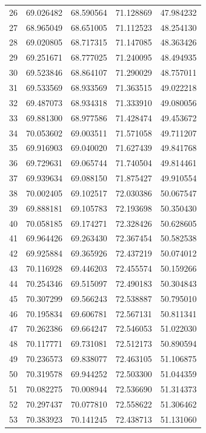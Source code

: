 \begin{table}
\begin{tabular}{rrrrr}
26 & 69.026482 & 68.590564 & 71.128869 & 47.984232 \\
27 & 68.965049 & 68.651005 & 71.112523 & 48.254130 \\
28 & 69.020805 & 68.717315 & 71.147085 & 48.363426 \\
29 & 69.251671 & 68.777025 & 71.240095 & 48.494935 \\
30 & 69.523846 & 68.864107 & 71.290029 & 48.757011 \\
31 & 69.533569 & 68.933569 & 71.363515 & 49.022218 \\
32 & 69.487073 & 68.934318 & 71.333910 & 49.080056 \\
33 & 69.881300 & 68.977586 & 71.428474 & 49.453672 \\
34 & 70.053602 & 69.003511 & 71.571058 & 49.711207 \\
35 & 69.916903 & 69.040020 & 71.627439 & 49.841768 \\
36 & 69.729631 & 69.065744 & 71.740504 & 49.814461 \\
37 & 69.939634 & 69.088150 & 71.875427 & 49.910554 \\
38 & 70.002405 & 69.102517 & 72.030386 & 50.067547 \\
39 & 69.888181 & 69.105783 & 72.193698 & 50.350430 \\
40 & 70.058185 & 69.174271 & 72.328426 & 50.628605 \\
41 & 69.964426 & 69.263430 & 72.367454 & 50.582538 \\
42 & 69.925884 & 69.365926 & 72.437219 & 50.074012 \\
43 & 70.116928 & 69.446203 & 72.455574 & 50.159266 \\
44 & 70.254346 & 69.515097 & 72.490183 & 50.304843 \\
45 & 70.307299 & 69.566243 & 72.538887 & 50.795010 \\
46 & 70.195834 & 69.606781 & 72.567131 & 50.811341 \\
47 & 70.262386 & 69.664247 & 72.546053 & 51.022030 \\
48 & 70.117771 & 69.731081 & 72.512173 & 50.890594 \\
49 & 70.236573 & 69.838077 & 72.463105 & 51.106875 \\
50 & 70.319578 & 69.944252 & 72.503300 & 51.044359 \\
51 & 70.082275 & 70.008944 & 72.536690 & 51.314373 \\
52 & 70.297437 & 70.077810 & 72.558622 & 51.306462 \\
53 & 70.383923 & 70.141245 & 72.438713 & 51.131060 \\

\end{tabular}
\end{table}

